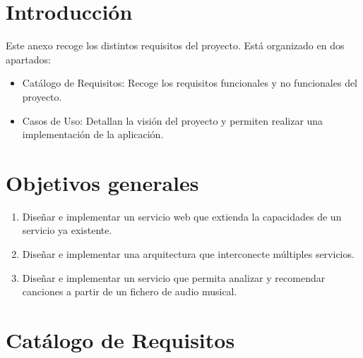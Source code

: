 
\section{Introducción}
Este anexo recoge los distintos requisitos del proyecto.
Está organizado en dos apartados: 
\begin{itemize}
    \item Catálogo de Requisitos: Recoge los requisitos funcionales y no funcionales del proyecto.
    \item Casos de Uso: Detallan la visión del proyecto y permiten realizar una implementación de la aplicación. 
\end{itemize}


\section{Objetivos generales}
\begin{enumerate}
    \item
        Diseñar e implementar un servicio web que extienda la capacidades de un servicio ya existente.
    \item 
        Diseñar e implementar una arquitectura que interconecte múltiples servicios.
    \item
        Diseñar e implementar un servicio que permita analizar y recomendar canciones a partir de un fichero de audio musical.
\end{enumerate}

\section{Catálogo de Requisitos}

